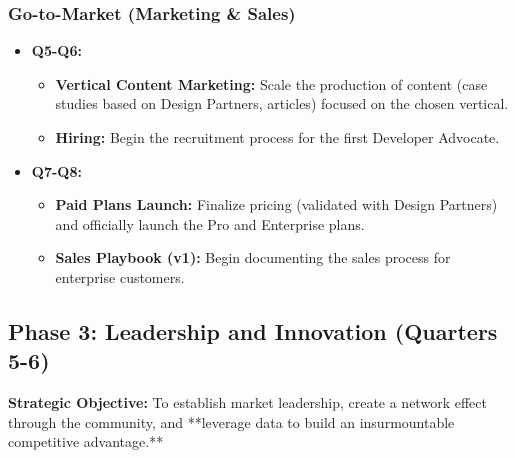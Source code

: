 \documentclass[11pt, a4paper, oneside]{article}
\begin{document}
\subsubsection{Go-to-Market (Marketing \& Sales)}
\begin{itemize}[leftmargin=*]
    \item \textbf{Q5-Q6:}
    \begin{itemize}
        \item \textbf{Vertical Content Marketing:} Scale the production of content (case studies based on Design Partners, articles) focused on the chosen vertical.
        \item \textbf{Hiring:} Begin the recruitment process for the first Developer Advocate.
    \end{itemize}
    \item \textbf{Q7-Q8:}
    \begin{itemize}
        \item \textbf{Paid Plans Launch:} Finalize pricing (validated with Design Partners) and officially launch the Pro and Enterprise plans.
        \item \textbf{Sales Playbook (v1):} Begin documenting the sales process for enterprise customers.
    \end{itemize}
\end{itemize}

\clearpage

\subsection{Phase 3: Leadership and Innovation (Quarters 5-6)}
\textbf{Strategic Objective:} To establish market leadership, create a network effect through the community, and **leverage data to build an insurmountable competitive advantage.**
\end{document}
